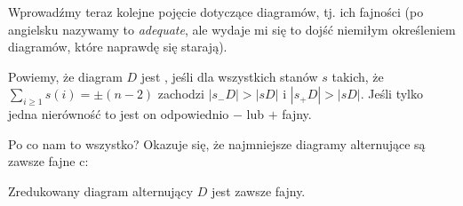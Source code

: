 \documentclass{article}
\begin{document}
Wprowadźmy teraz kolejne pojęcie dotyczące diagramów, tj. ich fajności (po angielsku nazywamy to \emph{adequate}, ale wydaje mi się to dojść niemiłym określeniem diagramów, które naprawdę się starają).

\begin{deff}
  Powiemy, że diagram $D$ jest , jeśli dla wszystkich stanów $s$ takich, że $\sum_{i\geq 1}s(i)=\pm(n-2)$ zachodzi $|s_-D|>|sD|$ i $|s_+D|>|sD|$. Jeśli tylko jedna nierówność to jest on odpowiednio $-$ lub $+$ fajny.
\end{deff}

Po co nam to wszystko? Okazuje się, że najmniejsze diagramy alternujące są zawsze fajne c:

\begin{fuck}
  Zredukowany diagram alternujący $D$ jest zawsze fajny.
\end{fuck}
\end{document}
